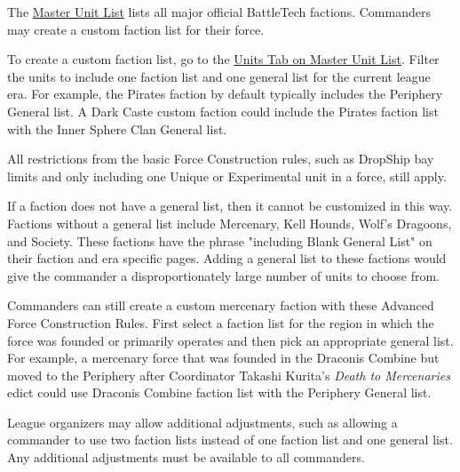 The \href{http://www.masterunitlist.info/}{Master Unit List} lists all major official BattleTech factions.
Commanders may create a custom faction list for their force.

To create a custom faction list, go to the \href{http://www.masterunitlist.info/Unit/Filter}{Units Tab on Master Unit List}.
Filter the units to include one faction list and one general list for the current league era.
For example, the Pirates faction by default typically includes the Periphery General list.
A Dark Caste custom faction could include the Pirates faction list with the Inner Sphere Clan General list.

All restrictions from the basic Force Construction rules, such as DropShip bay limits and only including one Unique or Experimental unit in a force, still apply.

If a faction does not have a general list, then it cannot be customized in this way.
Factions without a general list include Mercenary, Kell Hounds, Wolf's Dragoons, and Society.
These factions have the phrase "including Blank General List" on their faction and era specific pages.
Adding a general list to these factions would give the commander a disproportionately large number of units to choose from.

Commanders can still create a custom mercenary faction with these Advanced Force Construction Rules.
First select a faction list for the region in which the force was founded or primarily operates and then pick an appropriate general list.
For example, a mercenary force that was founded in the Draconis Combine but moved to the Periphery after Coordinator Takashi Kurita's \emph{Death to Mercenaries} edict could use Draconis Combine faction list with the Periphery General list.

League organizers may allow additional adjustments, such as allowing a commander to use two faction lists instead of one faction list and one general list.
Any additional adjustments must be available to all commanders.
